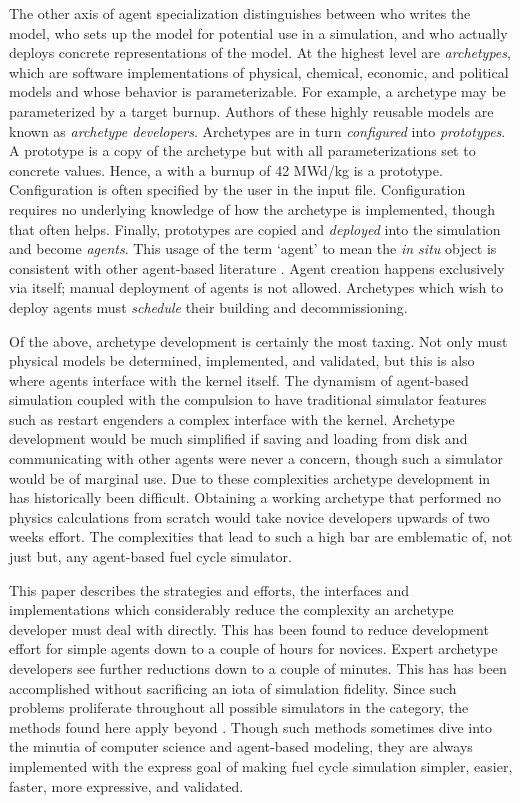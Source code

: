 The other axis of agent specialization distinguishes between who 
writes the model, who sets up the model for potential use in a simulation,
and who actually deploys concrete representations of the model.
At the highest level are \emph{archetypes}, which are software implementations
of physical, chemical, economic, and political models and whose behavior
is parameterizable. For example, a  archetype may be 
parameterized by a target burnup. Authors of these highly reusable models 
are known as \emph{archetype developers}. Archetypes are in turn 
\emph{configured} into \emph{prototypes}. A prototype is a copy 
of the archetype but with all parameterizations set to concrete 
values. Hence, a  with a burnup of 42 MWd/kg is a 
prototype. Configuration is often specified by the \cyclus user 
in the input file. Configuration requires no underlying knowledge of 
how the archetype is implemented, though that often helps.
Finally, prototypes are copied and \emph{deployed} into the simulation 
and become \emph{agents}. This usage of the term `agent' to mean 
the \emph{in situ} object is consistent with other agent-based
literature \citeme.  Agent creation happens exclusively via 
\cyclus itself; manual deployment of agents is not allowed.
Archetypes which wish to deploy agents must \emph{schedule} their building
and decommissioning.

Of the above, archetype development is certainly the most taxing.
Not only must physical models be determined, implemented, and 
validated, but this is also where agents interface with the 
\cyclus kernel itself. The dynamism of agent-based simulation 
coupled with the compulsion to have traditional simulator features 
such as restart engenders a complex interface with the kernel.
Archetype development would be much simplified if saving and 
loading from disk and communicating with other agents were 
never a concern, though such a simulator would be of marginal use.
Due to these complexities archetype development in \cyclus
has historically been difficult. Obtaining a working archetype
that performed no physics calculations from scratch would 
take novice developers upwards of two weeks effort.  The complexities
that lead to such a high bar are emblematic of, not just \cyclus
but, any agent-based fuel cycle simulator.

This paper describes the strategies and efforts, the interfaces
and implementations which considerably reduce the complexity  
an archetype developer must deal with directly. This has been 
found to reduce development effort for simple agents down to a couple 
of hours for novices. Expert archetype developers see further 
reductions down to a couple of minutes. This has has been accomplished 
without sacrificing an iota of simulation fidelity. Since such 
problems proliferate throughout all possible simulators in 
the \cyclus category, the methods found here apply beyond \cyclus.
Though such methods sometimes dive into the minutia of 
computer science and agent-based modeling, they are always implemented
with the express goal of making fuel cycle simulation 
simpler, easier, faster, more expressive, and validated.

